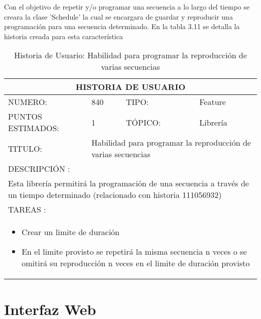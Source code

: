 Con el objetivo de repetir y/o programar una secuencia a lo largo del tiempo se
creara la clase 'Schedule' la cual se encargara de guardar y reproducir una
programación para una secuencia determinado. En la tabla 3.11 se detalla la
historia creada para esta característica

\begin{table}[h]
\centering
\renewcommand{\arraystretch}{1.4}
\begin{tabular}{|*{4}{l|}}
\hline
\multicolumn{4}{|c|}{HISTORIA DE USUARIO} \\ \hline
NUMERO: & 840 & TIPO: & Feature \\ \hline
PUNTOS ESTIMADOS: & 1 & TÓPICO: & Librería \\ \hline
TITULO: & \multicolumn{3}{|p{7.2cm}|}{ Habilidad para programar la reproducción de varias secuencias} \\ \hline
\multicolumn{4}{|l|}{DESCRIPCIÓN : } \\ \hline
\multicolumn{4}{|p{11cm}|}{Esta librería permitirá la programación de una secuencia a través de un tiempo determinado (relacionado con historia 111056932)} \\ \hline
\multicolumn{4}{|l|}{TAREAS : } \\ \hline
\multicolumn{4}{|p{11cm}|}{
\begin{minipage}[t]{\hsize}
  \begin{itemize}
    \item Crear un limite de duración
    \item En el limite provisto se repetirá la misma secuencia n veces o se omitirá su reproducción n veces en el limite de duración provisto
  \end{itemize}
\end{minipage}
} \\ \hline
\end{tabular}
\caption{Historia de Usuario: Habilidad para programar la reproducción de varias secuencias}
\label{tab:Primero}
\end{table}

\section{Interfaz Web}
